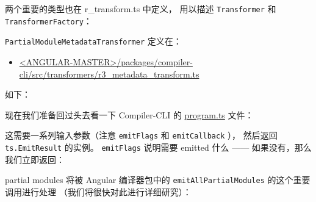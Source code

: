 两个重要的类型也在 r\_transform.ts 中定义，
用以描述 \texttt{Transformer} 和 \texttt{TransformerFactory}：




\texttt{PartialModuleMetadataTransformer} 定义在：

\begin{itemize}
  \item \href{https://github.com/angular/angular/blob/master/packages/compiler-cli/src/transformers/r3_metadata_transform.ts}
        {<ANGULAR-MASTER>/packages/compiler-cli/src/transformers/r3\_metadata\_transform.ts}
\end{itemize}


如下：




现在我们准备回过头去看一下 Compiler-CLI 的
\href{https://github.com/angular/angular/blob/c8a1a14b87e5907458e8e87021e47f9796cb3257/packages/compiler-cli/src/transformers/program.ts}
{program.ts}
文件：




这需要一系列输入参数（注意 \texttt{emitFlags}  和 \texttt{emitCallback} ），
然后返回 \texttt{ts.EmitResult}  的实例。
\texttt{emitFlags} 说明需要 emitted 什么 —— 如果没有，那么我们立即返回：




partial modules 将被 Angular 编译器包中的 \texttt{emitAllPartialModules} 的这个重要调用进行处理
（我们将很快对此进行详细研究）：



